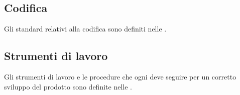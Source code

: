 	\subsection{Codifica} %
	\label{sub:codifica}
	Gli standard relativi alla codifica sono definiti nelle \docNameVersionNdP.

	\subsection{Strumenti di lavoro} %
	\label{sub:strumenti_di_lavoro}
	Gli strumenti di lavoro e le procedure che ogni \roleProgrammer{} deve seguire per un corretto sviluppo del prodotto sono definite nelle \docNameVersionNdP.

